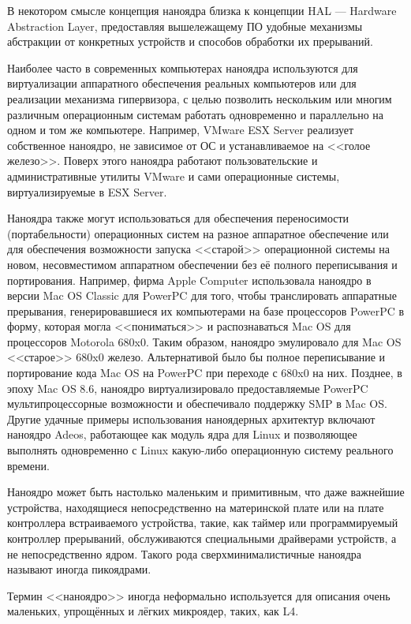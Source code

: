 В некотором смысле концепция наноядра близка к концепции HAL --- Hardware Abstraction Layer, предоставляя вышележащему ПО удобные механизмы абстракции от конкретных устройств и способов обработки их прерываний.

Наиболее часто в современных компьютерах наноядра используются для виртуализации аппаратного обеспечения реальных компьютеров или для реализации механизма гипервизора, с целью позволить нескольким или многим различным операционным системам работать одновременно и параллельно на одном и том же компьютере.
Например, VMware ESX Server реализует собственное наноядро, не зависимое от ОС и устанавливаемое на <<голое железо>>. Поверх этого наноядра работают пользовательские и административные утилиты VMware и сами операционные системы, виртуализируемые в ESX Server.

Наноядра также могут использоваться для обеспечения переносимости (портабельности) операционных систем на разное аппаратное обеспечение или для обеспечения возможности запуска <<старой>> операционной системы на новом, несовместимом аппаратном обеспечении без её полного переписывания и портирования.
Например, фирма Apple Computer использовала наноядро в версии Mac OS Classic для PowerPC для того, чтобы транслировать аппаратные прерывания, генерировавшиеся их компьютерами на базе процессоров PowerPC в форму, которая могла <<пониматься>> и распознаваться Mac OS для процессоров Motorola 680x0. Таким образом, наноядро эмулировало для Mac OS <<старое>> 680x0 железо.
Альтернативой было бы полное переписывание и портирование кода Mac OS на PowerPC при переходе с 680x0 на них. Позднее, в эпоху Mac OS 8.6, наноядро виртуализировало предоставляемые PowerPC мультипроцессорные возможности и обеспечивало поддержку SMP в Mac OS.
Другие удачные примеры использования наноядерных архитектур включают наноядро Adeos, работающее как модуль ядра для Linux и позволяющее выполнять одновременно с Linux какую-либо операционную систему реального времени.

Наноядро может быть настолько маленьким и примитивным, что даже важнейшие устройства, находящиеся непосредственно на материнской плате или на плате контроллера встраиваемого устройства, такие, как таймер или программируемый контроллер прерываний, обслуживаются специальными драйверами устройств, а не непосредственно ядром. Такого рода сверхминималистичные наноядра называют иногда пикоядрами.

Термин <<наноядро>> иногда неформально используется для описания очень маленьких, упрощённых и лёгких микроядер, таких, как L4.

